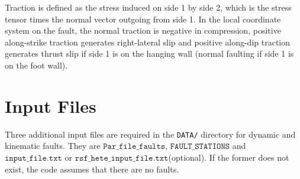Traction is defined as the stress induced on side 1 by side 2, which
is the stress tensor times the normal vector outgoing from side 1.
In the local coordinate system on the fault, the normal traction is
negative in compression, positive along-strike traction generates
right-lateral slip and positive along-dip traction generates thrust
slip if side 1 is on the hanging wall (normal faulting if side 1 is
on the foot wall).


\section{Input Files}

Three additional input files are required in the \texttt{DATA/} directory
for dynamic and kinematic faults. They are $\mathtt{Par\_file\_faults}$,
$\mathtt{FAULT\_STATIONS}$ and $\mathtt{input\_file.txt}$ or $\mathtt{rsf\_hete\_input\_file.txt}$(optional).
If the former does not exist, the code assumes that there are no faults.\\

